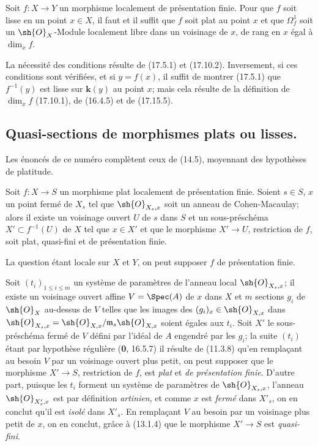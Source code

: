 \begin{proposition}[17.15.15]
\label{IV.17.15.15}
Soit $f:X\to Y$ un morphisme localement de présentation finie. Pour que $f$ soit lisse en un point $x\in X$, il faut et il suffit que $f$ soit plat au point $x$ et que $\varOmega^1_f$ soit un $\sh{O}_X$-Module localement libre dans un voisinage de $x$, de rang en $x$ égal à $\dim_x f$.
\end{proposition}

La nécessité des conditions résulte de (17.5.1) et (17.10.2). Inversement, si ces conditions sont vérifiées, et si $y=f(x)$, il suffit de montrer (17.5.1) que $f^{-1}(y)$ est lisse sur $\boldsymbol{k}(y)$ au point $x$; mais cela résulte de la définition de $\dim_x f$ (17.10.1), de (16.4.5) et de (17.15.5).

\subsection{Quasi-sections de morphismes plats ou lisses.}

Les énoncés de ce numéro complètent ceux de (14.5), moyennant des hypothèses de platitude.

\begin{proposition}[17.16.1]
\label{IV.17.16.1}
Soit $f:X\to S$ un morphisme plat localement de présentation finie. Soient $s\in S$, $x$ un point fermé de $X_s$ tel que $\sh{O}_{X_s,x}$ soit un anneau de Cohen-Macaulay; alors il existe un voisinage ouvert $U$ de $s$ dans $S$ et un sous-préschéma $X'\subset f^{-1}(U)$ de $X$ tel que $x\in X'$ et que le morphisme $X'\to U$, restriction de $f$, soit plat, quasi-fini et de présentation finie.
\end{proposition}

La question étant locale sur $X$ et $Y$, on peut supposer $f$ de présentation finie.

Soit $(t_i)_{1\leq i\leq m}$ un système de paramètres de l'anneau local $\sh{O}_{X_s,x}$; il existe un voisinage ouvert affine $V=\Spec(A)$ de $x$ dans $X$ et $m$ sections $g_i$ de $\sh{O}_X$ au-dessus de $V$ telles que
les images des $(g_i)_x\in\sh{O}_{X,x}$ dans $\sh{O}_{X_s,x}=\sh{O}_{X,x}/\mathfrak m_s\sh{O}_{X,x}$ soient égales aux $t_i$. Soit $X'$ le sous-préschéma fermé de $V$ défini par l'idéal de $A$ engendré par les $g_i$; la suite $(t_i)$ étant par hypothèse régulière (\textbf{0}, 16.5.7) il résulte de (11.3.8) qu'en remplaçant au besoin $V$ par un voisinage ouvert plus petit, on peut supposer que le morphisme $X'\to S$, restriction de $f$, est \emph{plat} et \emph{de présentation finie}. D'autre part, puisque les $t_i$ forment un système de paramètres de $\sh{O}_{X_s,x}$, l'anneau $\sh{O}_{X'_s,x}$ est par définition \emph{artinien}, et comme $x$ est \emph{fermé} dans $X'_s$, on en conclut qu'il est \emph{isolé} dans $X'_s$. En remplaçant $V$ au besoin par un voisinage plus petit de $x$, on en conclut, grâce à (13.1.4) que le morphisme $X'\to S$ est \emph{quasi-fini}.

